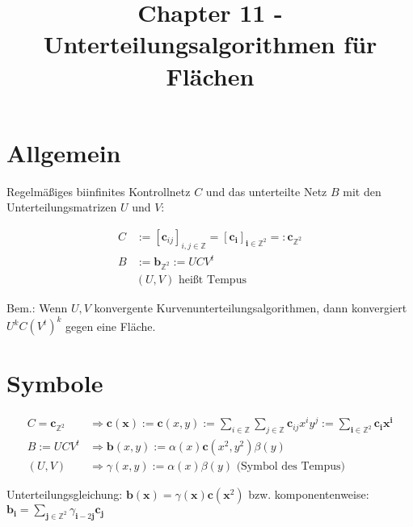 \documentclass[8pt, DIV15, twocolumn]{scrartcl}
\title{Chapter 11 - Unterteilungsalgorithmen für Flächen}
\date{}
\begin{document}
\setlength{\abovedisplayskip}{0pt}
\setlength{\belowdisplayskip}{0pt}
\setlength{\parskip}{0pt}
\setlength{\topmargin}{0pt}

 
\maketitle

\thispagestyle{empty}

\section*{Allgemein}
Regelmäßiges biinfinites Kontrollnetz $C$ und das unterteilte Netz $B$ mit den Unterteilungsmatrizen $U$ und $V$:

\begin{equation*}
\begin{aligned}
C &:= [\mathbf{c}_{ij}]_{i,j\in \mathbb{Z}} = [\mathbf{c_i}]_{\mathbf{i}\in\mathbb{Z}^2} =: \mathbf{c}_{\mathbb{Z}^2} \\
B &:= \mathbf{b}_{\mathbb{Z}^2} := UCV^t \\
&\left(U,V\right) \text{ heißt Tempus}
\end{aligned}
\end{equation*}

Bem.: Wenn $U, V$ konvergente Kurvenunterteilungsalgorithmen, dann konvergiert $U^k C \left(V^t\right)^k$ gegen eine Fläche.

\section*{Symbole}

\begin{equation*}
\begin{aligned}
C = \mathbf{c}_{\mathbb{Z}^2} &\Rightarrow \mathbf{c} \left(\mathbf{x}\right) := \mathbf{c} \left(x,y\right) := \sum\limits_{i\in\mathbb{Z}} \sum\limits_{j\in\mathbb{Z}} \mathbf{c}_{ij} x^i y^j := \sum\limits_{\mathbf{i}\in\mathbb{Z}^2} \mathbf{c_i x^i} \\
B := UCV^t &\Rightarrow \mathbf{b} \left(x,y\right) := \alpha \left(x\right) \mathbf{c} \left(x^2,y^2\right) \beta \left(y\right) \\
\left(U,V\right) &\Rightarrow \gamma \left(x,y\right) := \alpha\left(x\right) \beta\left(y\right) \text{ (Symbol des Tempus)}
\end{aligned}
\end{equation*}

Unterteilungsgleichung: $\mathbf{b}\left(\mathbf{x}\right) = \gamma \left(\mathbf{x}\right) \mathbf{c} \left(\mathbf{x}^2\right)$ bzw. komponentenweise: $\mathbf{b_i} = \sum\limits_{\mathbf{j}\in\mathbb{Z}^2} \gamma_{\mathbf{i}-2\mathbf{j}} \mathbf{c_j}$
\end{document}
